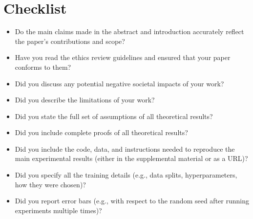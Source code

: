 \section*{Checklist}

\begin{itemize}
    \item 
    Do the main claims made in the abstract and introduction accurately reflect the paper's contributions and scope?
    
    
    \item
    Have you read the ethics review guidelines and ensured that your paper conforms to them?
    
    \answerYes{}
    
    \item
    Did you discuss any potential negative societal impacts of your work?
    
    
    \item
    Did you describe the limitations of your work?
    
    
    \item
    Did you state the full set of assumptions of all theoretical results?
    
    
    \item
    Did you include complete proofs of all theoretical results?
    
    
    \item
    Did you include the code, data, and instructions needed to reproduce the main experimental results (either in the supplemental material or as a URL)?
    
    
    \item
    Did you specify all the training details (e.g., data splits, hyperparameters, how they were chosen)?
    
    
    \item
    Did you report error bars (e.g., with respect to the random seed after running experiments multiple times)?
    

\end{itemize}

